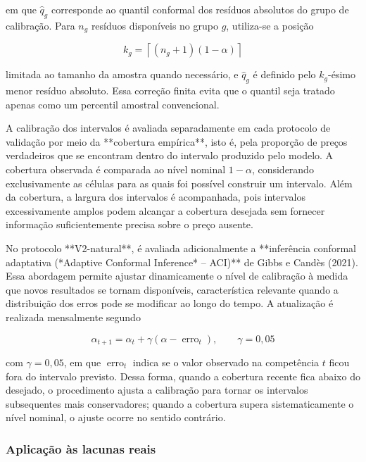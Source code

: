 em que \(\widehat{q}_{g}\) corresponde ao quantil conformal dos resíduos absolutos do grupo de calibração. Para \(n_g\) resíduos 
disponíveis no grupo \(g\), utiliza-se a posição

\begin{equation} k_g = \left\lceil (n_g + 1)(1-\alpha) \right\rceil \label{eq:quantil-conformal} \end{equation}

limitada ao tamanho da amostra quando necessário, e \(\widehat{q}_{g}\) é definido pelo \(k_g\)-ésimo menor resíduo absoluto. 
Essa correção finita evita que o quantil seja tratado apenas como um percentil amostral convencional.

A calibração dos intervalos é avaliada separadamente em cada protocolo de validação por meio da **cobertura empírica**, isto é, 
pela proporção de preços verdadeiros que se encontram dentro do intervalo produzido pelo modelo. A cobertura observada é 
comparada ao nível nominal \(1-\alpha\), considerando exclusivamente as células para as quais foi possível construir um 
intervalo. Além da cobertura, a largura dos intervalos é acompanhada, pois intervalos excessivamente amplos podem alcançar a 
cobertura desejada sem fornecer informação suficientemente precisa sobre o preço ausente.

No protocolo **V2-natural**, é avaliada adicionalmente a **inferência conformal adaptativa 
(*Adaptive Conformal Inference* -- ACI)** de Gibbs e Candès (2021). Essa abordagem permite ajustar dinamicamente o nível de 
calibração à medida que novos resultados se tornam disponíveis, característica relevante quando a distribuição dos erros pode se 
modificar ao longo do tempo. A atualização é realizada mensalmente segundo

\begin{equation} \alpha_{t+1} = \alpha_t + \gamma \left( \alpha - \operatorname{erro}_t \right), \qquad \gamma = 0{,}05 \label{eq:aci} \end{equation}

com \(\gamma=0,05\), em que \(\operatorname{erro}_t\) indica se o valor observado na competência \(t\) ficou fora do intervalo previsto. Dessa forma, quando a cobertura recente fica abaixo do desejado, o procedimento ajusta a calibração para tornar os intervalos subsequentes mais conservadores; quando a cobertura supera sistematicamente o nível nominal, o ajuste ocorre no sentido contrário.

\subsubsection{Aplicação às lacunas reais}

